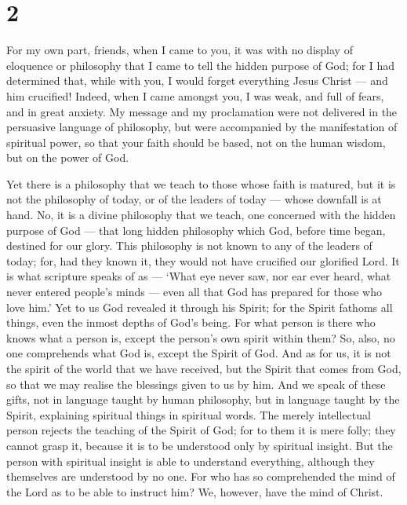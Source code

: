 \hypertarget{section-1}{%
\section{2}\label{section-1}}

 For my own part, friends, when I came to you, it was with
no display of eloquence or philosophy that I came to tell the hidden
purpose of God;  for I had determined that, while with you,
I would forget everything Jesus Christ --- and him crucified!
 Indeed, when I came amongst you, I was weak, and full of
fears, and in great anxiety.  My message and my proclamation
were not delivered in the persuasive language of philosophy, but were
accompanied by the manifestation of spiritual power,  so
that your faith should be based, not on the human wisdom, but on the
power of God.

 Yet there is a philosophy that we teach to those whose
faith is matured, but it is not the philosophy of today, or of the
leaders of today --- whose downfall is at hand.  No, it is a
divine philosophy that we teach, one concerned with the hidden purpose
of God --- that long hidden philosophy which God, before time began,
destined for our glory.  This philosophy is not known to any
of the leaders of today; for, had they known it, they would not have
crucified our glorified Lord.  It is what scripture speaks
of as --- `What eye never saw, nor ear ever heard, what never entered
people's minds --- even all that God has prepared for those who love
him.'  Yet to us God revealed it through his Spirit; for
the Spirit fathoms all things, even the inmost depths of God's being.
 For what person is there who knows what a person is,
except the person's own spirit within them? So, also, no one comprehends
what God is, except the Spirit of God.  And as for us, it
is not the spirit of the world that we have received, but the Spirit
that comes from God, so that we may realise the blessings given to us by
him.  And we speak of these gifts, not in language taught
by human philosophy, but in language taught by the Spirit, explaining
spiritual things in spiritual words.  The merely
intellectual person rejects the teaching of the Spirit of God; for to
them it is mere folly; they cannot grasp it, because it is to be
understood only by spiritual insight.  But the person with
spiritual insight is able to understand everything, although they
themselves are understood by no one.  For who has so
comprehended the mind of the Lord as to be able to instruct him? We,
however, have the mind of Christ.

